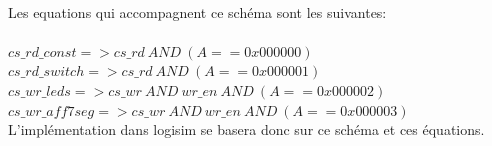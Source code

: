 \begin{center}
\\\par
{}
\end{center}\par
Les equations qui accompagnent ce schéma sont les suivantes:\\\\
$cs\_rd\_const => cs\_rd \:AND\: (A == 0x000000)$\\
$cs\_rd\_switch => cs\_rd \:AND\: (A == 0x000001)$\\
$cs\_wr\_leds => cs\_wr \: AND\: wr\_en \:AND\: (A == 0x000002)$\\
$cs\_wr\_aff7seg => cs\_wr \: AND\: wr\_en \:AND\: (A == 0x000003)$\\
L'implémentation dans logisim se basera donc sur ce schéma et ces équations.

